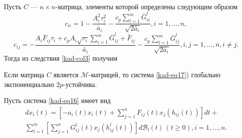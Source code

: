Пусть $C$ --- $n\times n$-матрица, элементы которой определены
следующим образом
$$
c_{ii} = 1 - \frac{A_i^2\tau _i^2 }{\bar a_i} - \frac{c_p\sum
\limits _{l=1}^m \bar G^l_{ii}}{\sqrt{2\bar a_i}}, i = 1,...,n,
$$
$$
c_{ij} = - \frac{A_i\bar F_{ij}\tau _i + c_p A_i \sqrt{\tau _i}\sum
\limits _{i=1}^m\bar G^l_{ij} + \bar F_{ij}}{\bar a_i} -
\frac{c_p\sum \limits _{l=1}^m \bar G^l_{ij}}{\sqrt{2\bar a_i}}, i,j
= 1,...,n, i\neq j.
$$
Тогда из следствия \ref{kad-col3} получим
\begin{corollary}\label{kad-col4}
Если матрица $C$ является $\mathcal{M}$-матрицей, то система \eqref{kad-eq17}) глобально экспоненциально $2p$-устойчива.
\end{corollary}
Пусть система \eqref{kad-eq16} имеет вид
\begin{equation}\label{kad-eq18}
  \begin{array}{crl}
dx_i(t) = \left [-a_i(t)x_i(t)+ \sum
\limits_{j=1}^nF_{ij}(t)x_j(h_{ij}(t))\right]dt +\\
 \sum \limits_{l=1}^m \left [\sum
\limits_{j=1}^nG^l_{ij}(t)x_j(h^l_{ij}(t))\right ]d\mathcal B_l(t)
\, (t \ge 0), i = 1,...,n.
\end{array}
\end{equation}


